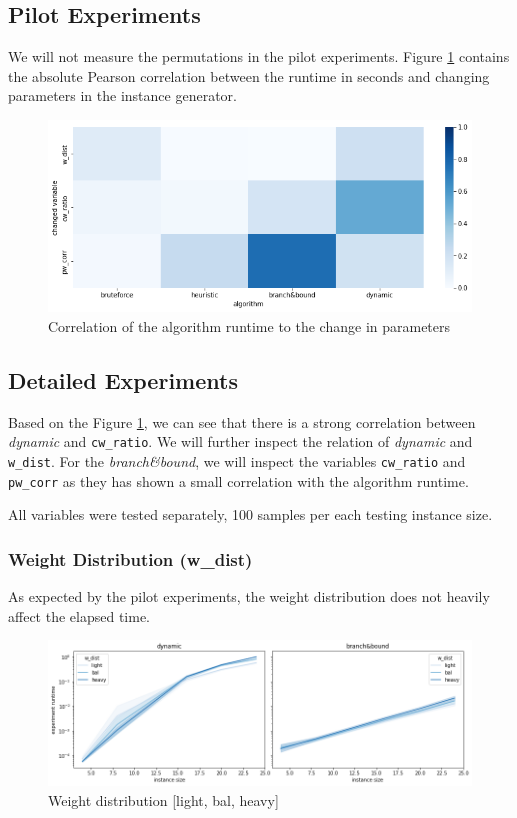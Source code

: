 \documentclass[a4paper,10pt]{article}
\begin{document}
\subsection{Pilot Experiments}

 We will not measure the permutations in the pilot experiments. Figure \ref{pilot_figure} contains the absolute Pearson correlation between the runtime in seconds and changing parameters in the instance generator.

\begin{figure}[!htb]
	\centering
  	\includegraphics[width=\textwidth]{images/pilot.png}
	\caption{Correlation of the algorithm runtime to the change in parameters}
	\label{pilot_figure}
\end{figure}

\subsection{Detailed Experiments}

Based on the Figure \ref{pilot_figure}, we can see that there is a strong correlation between \emph{dynamic} and \lstinline{cw_ratio}. We will further inspect the relation of \emph{dynamic} and \lstinline{w_dist}. For the \emph{branch\&bound}, we will inspect the variables \lstinline{cw_ratio} and \lstinline{pw_corr} as they has shown a small correlation with the algorithm runtime.

All variables were tested separately, 100 samples per each testing instance size.

\subsubsection{Weight Distribution (w\_dist)}

As expected by the pilot experiments, the weight distribution does not heavily affect the elapsed time.

\begin{figure}[!htb]
	\centering
  	\includegraphics[width=\textwidth]{images/wdist.png}
	\caption{Weight distribution [light, bal, heavy]}
	\label{wdist}
\end{figure}
\end{document}
